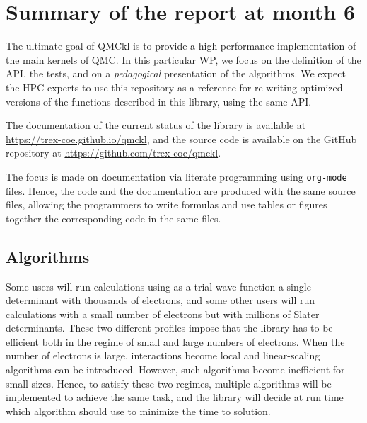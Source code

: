 \newcommand{\orgmode}{\texttt{org-mode}}
\newcommand{\Makefile}{\texttt{Makefile}}
\newcommand{\context}{\texttt{context}}
\newcommand{\CC}{C\nolinebreak\hspace{-.05em}\raisebox{.4ex}{\tiny\bf +}\nolinebreak\hspace{-.10em}\raisebox{.4ex}{\tiny\bf +}}
\def\CC{{C\nolinebreak[4]\hspace{-.05em}\raisebox{.4ex}{\tiny\bf ++}}}

\section{Summary of the report at month 6}


The ultimate goal of \ac{QMCkl} is to provide a high-performance
implementation of the main kernels of \ac{QMC}. In this particular
\ac{WP}, we focus on the definition of the \ac{API}, the tests,
and on a \emph{pedagogical} presentation of the algorithms.  We expect
the \ac{HPC} experts to use this repository as a reference for re-writing
optimized versions of the functions described in this library, using
the same \ac{API}.

The documentation of the current status of the library is available
at \url{https://trex-coe.github.io/qmckl}, and the source code is
available on the GitHub repository at \url{https://github.com/trex-coe/qmckl}.

The focus is made on documentation via literate programming using {\orgmode}
files.\cite{schulte_2012,orgmode} Hence, the code and the documentation are
produced with the same source files, allowing the programmers to write \LaTex
formulas and use tables or figures together the corresponding code in the same 
files.

\subsection{Algorithms}

Some users will run calculations using as a trial wave function a
single determinant with thousands of electrons, and some other users
will run calculations with a small number of electrons but with millions
of Slater determinants. These two different profiles impose that the
library has to be efficient both in the regime of small and large numbers
of electrons. When the number of electrons is large, interactions
become local and linear-scaling algorithms can be introduced. However,
such algorithms become inefficient for small sizes.  Hence, to
satisfy these two regimes, multiple algorithms will be implemented to
achieve the same task, and the library will decide at run time which
algorithm should use to minimize the time to solution.


